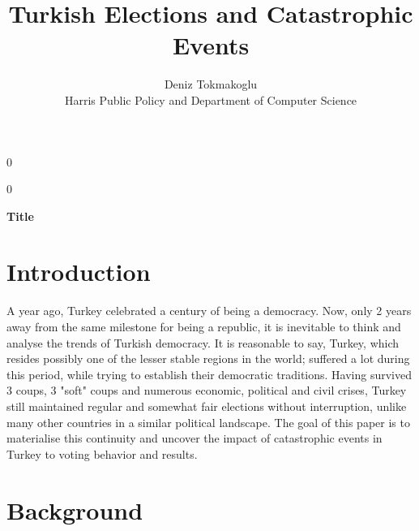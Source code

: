\documentclass[12pt]{article}
\newcommand{\blind}{0}
\begin{document}
%

\def\spacingset#1{\renewcommand{\baselinestretch}%
{#1}\small\normalsize} \spacingset{1}



\blind
{
  \title{\bf Turkish Elections and Catastrophic Events}
    {
}
\author{\name Deniz Tokmakoglu\\
       \addr Harris Public Policy and Department of Computer Science\\
       \address{\href{https://github.com/deniztokmakoglu/turkish_election_analysis}{GitHub}}}
\maketitle


  \maketitle
} \fi

\blind
{
  \bigskip
  \bigskip
  \bigskip
  \begin{center}
    {\LARGE\bf Title}
\end{center}
  \medskip
} \fi

\spacingset{1.45} %
\section{Introduction}
\label{sec:intro}

A year ago, Turkey celebrated a century of being a democracy. Now, only 2 years away from the same milestone for being a republic, it is inevitable to think and analyse the trends of Turkish democracy. 
It is reasonable to say, Turkey, which resides possibly one of the lesser stable regions in the world; suffered a lot during this period, while trying to establish their democratic traditions. Having survived 3 coups, 3 "soft" coups and numerous economic, political and civil crises, Turkey still maintained regular and somewhat fair elections without interruption, unlike many other countries in a similar political landscape. The goal of this paper is to materialise this continuity and uncover the impact of catastrophic events in Turkey to voting behavior and results. 

\section{Background}
\end{document}
